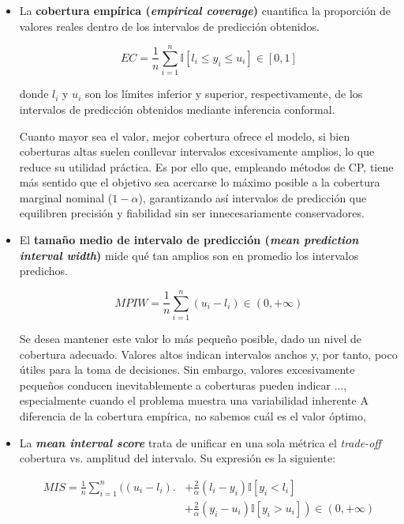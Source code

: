 \begin{itemize}
    \item La \textbf{cobertura empírica (\textit{empirical coverage})} cuantifica la proporción de valores reales dentro de los intervalos de predicción obtenidos. 
    
    $$
    EC = \frac{1}{n} 
        \sum_{i=1}^n{ \mathbb{I} \left[ l_i \le y_i \le u_i \right] } 
            \in \left[0, 1\right]
    $$

    donde $l_i$ y $u_i$ son los límites inferior y superior, respectivamente, de los intervalos de predicción obtenidos mediante inferencia conformal.

    Cuanto mayor sea el valor, mejor cobertura ofrece el modelo, si bien coberturas altas suelen conllevar intervalos excesivamente amplios, lo que reduce su utilidad práctica. Es por ello que, empleando métodos de \acrshort{CP}, tiene más sentido que el objetivo sea acercarse lo máximo posible a la cobertura marginal nominal ($1-\alpha$), garantizando así intervalos de predicción que equilibren precisión y fiabilidad sin ser innecesariamente conservadores. 
    
    \item El \textbf{tamaño medio de intervalo de predicción (\textit{mean prediction interval width})} mide qué tan amplios son en promedio los intervalos predichos.
    
    $$
    MPIW = \frac{1}{n} \sum_{i=1}^n{ \left( u_i - l_i \right) } \in (0, +\infty)
    $$
    
    Se desea mantener este valor lo más pequeño posible, dado un nivel de cobertura adecuado. Valores altos indican intervalos anchos y, por tanto, poco útiles para la toma de decisiones. Sin embargo, valores excesivamente pequeños conducen inevitablemente a coberturas pueden indicar ..., especialmente cuando el problema muestra una variabilidad inherente
    A diferencia de la cobertura empírica, no sabemos cuál es el valor óptimo, 

    \item La \textbf{\textit{mean interval score}} \cite{gneiting2007} trata de unificar en una sola métrica el \textit{trade-off} cobertura vs. amplitud del intervalo. Su expresión es la siguiente:

    \begin{align*} 
    MIS = \frac{1}{n} \sum_{i=1}^n
    \biggl( (u_i-l_i) \biggr.&+ \frac{2}{\alpha} \left( l_i-y_i \right) \mathbb{I}\left[ y_i<l_i \right] \\
    &+\left. \frac{2}{\alpha}  \left( y_i-u_i \right) \mathbb{I}\left[ y_i>u_i \right] \right)
    \in \left( 0, +\infty \right)
    \end{align*}


\end{itemize}
